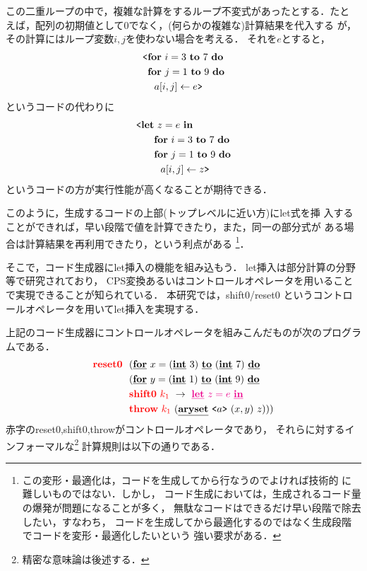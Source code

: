 この二重ループの中で，複雑な計算をするループ不変式があったとする．たと
えば，配列の初期値として$0$でなく，(何らかの複雑な)計算結果を代入する
が，その計算にはループ変数$i,j$を使わない場合を考える．
それを$e$とすると，
\begin{align*}
& \codebegin \forin{i=3}{7} \\
& \phantom{\codebegin} \forin{j=1}{9} \\
& \phantom{\codebegin} ~~\aryset{a}{i,j}{e} \codeend
\end{align*}
というコードの代わりに
\begin{align*}
& \codebegin \Let~z=e~\In \\
& \phantom{\codebegin \Let} \forin{i=3}{7} \\
& \phantom{\codebegin \Let} \forin{j=1}{9} \\
& \phantom{\codebegin \Let} ~~\aryset{a}{i,j}{z} \codeend
\end{align*}
というコードの方が実行性能が高くなることが期待できる．

このように，生成するコードの上部(トップレベルに近い方)にlet式を挿
入することができれば，早い段階で値を計算できたり，また，同一の部分式が
ある場合は計算結果を再利用できたり，という利点がある%
\footnote{この変形・最適化は，コードを生成してから行なうのでよければ技術的
に難しいものではない．しかし，
コード生成においては，生成されるコード量の爆発が問題になることが多く，
無駄なコードはできるだけ早い段階で除去したい，すなわち，
コードを生成してから最適化するのではなく生成段階でコードを変形・最適化したいという
強い要求がある．}．

そこで，コード生成器にlet挿入の機能を組み込もう．
let挿入は部分計算の分野等で研究されており，
CPS変換あるいはコントロールオペレータを用いることで実現できることが知られている．
本研究では，shift0/reset0 というコントロールオペレータを用いてlet挿入を実現する．

上記のコード生成器にコントロールオペレータを組みこんだものが次のプログラムである．
\begin{align*}
&\red{\Resetz} ~~(\cforin{x=(\cint~3)}{(\cint~7)} \\
&\phantom{\Resetz} ~~(\cforin{y=(\cint~1)}{(\cint~9)} \\
&\phantom{\Resetz} ~~\red{\Shiftz}~\red{k_1}~\to~ \magenta{\cLet~z=e~\cIn} \\
&\phantom{\Resetz} ~~\red{\Throw}~\red{k_1}~(\caryset{\code{a}}{(x,y)}{z})))
\end{align*}
赤字のreset0,shift0,throwがコントロールオペレータであり，
それらに対するインフォーマルな\footnote{精密な意味論は後述する．}%
計算規則は以下の通りである．

